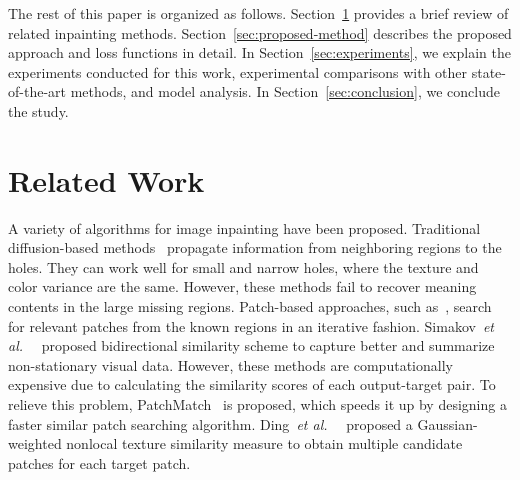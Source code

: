 \documentclass[journal]{IEEEtran}
\newcommand{\etal}{\emph{et al.}~}
\begin{document}
The rest of this paper is organized as follows. Section~\ref{sec:related-work} provides a brief review of related inpainting methods. Section~\ref{sec:proposed-method} describes the proposed approach and loss functions in detail. In Section~\ref{sec:experiments}, we explain the experiments conducted for this work, experimental comparisons with other state-of-the-art methods, and model analysis. In Section~\ref{sec:conclusion}, we conclude the study.

\section{Related Work}\label{sec:related-work}
A variety of algorithms for image inpainting have been proposed. Traditional diffusion-based methods~\cite{image-inpainting,joint-interpolation} propagate information from neighboring regions to the holes. They can work well for small and narrow holes, where the texture and color variance are the same. However, these methods fail to recover meaning contents in the large missing regions. Patch-based approaches, such as~\cite{image-quilting,texture-optimization}, search for relevant patches from the known regions in an iterative fashion. Simakov~\etal~\cite{bidirectional-similarity} proposed bidirectional similarity scheme to capture better and summarize non-stationary visual data. However, these methods are computationally expensive due to calculating the similarity scores of each output-target pair. To relieve this problem, PatchMatch~\cite{patch-match} is proposed, which speeds it up by designing a faster similar patch searching algorithm. Ding~\etal~\cite{nonlocal-texture-matching} proposed a Gaussian-weighted nonlocal texture similarity measure to obtain multiple candidate patches for each target patch.
\end{document}
